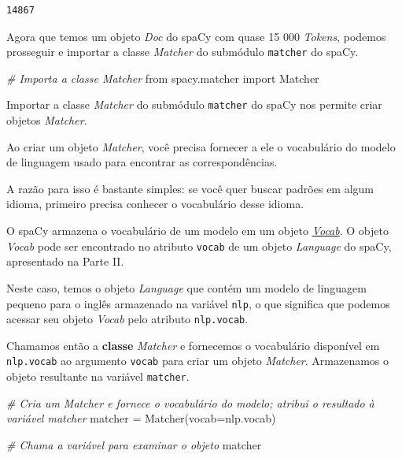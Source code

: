 \documentclass[
  brazilian,
]{article}
\newenvironment{Shaded}{}{}
\newcommand{\CommentTok}[1]{\textcolor[rgb]{0.38,0.63,0.69}{\textit{#1}}}
\newcommand{\ImportTok}[1]{#1}
\newcommand{\NormalTok}[1]{#1}
\newcommand{\OperatorTok}[1]{\textcolor[rgb]{0.40,0.40,0.40}{#1}}
\begin{document}
\begin{verbatim}
14867
\end{verbatim}

Agora que temos um objeto \emph{Doc} do spaCy com quase 15 000
\emph{Tokens}, podemos prosseguir e importar a classe \emph{Matcher} do
submódulo \texttt{matcher} do spaCy.

\begin{Shaded}
\begin{Highlighting}[]
\CommentTok{\# Importa a classe Matcher}
\ImportTok{from}\NormalTok{ spacy.matcher }\ImportTok{import}\NormalTok{ Matcher}
\end{Highlighting}
\end{Shaded}

Importar a classe \emph{Matcher} do submódulo \texttt{matcher} do spaCy
nos permite criar objetos \emph{Matcher}.

Ao criar um objeto \emph{Matcher}, você precisa fornecer a ele o
vocabulário do modelo de linguagem usado para encontrar as
correspondências.

A razão para isso é bastante simples: se você quer buscar padrões em
algum idioma, primeiro precisa conhecer o vocabulário desse idioma.

O spaCy armazena o vocabulário de um modelo em um objeto
\href{https://spacy.io/api/vocab}{\emph{Vocab}}. O objeto \emph{Vocab}
pode ser encontrado no atributo \texttt{vocab} de um objeto
\emph{Language} do spaCy, apresentado na Parte II.

Neste caso, temos o objeto \emph{Language} que contém um modelo de
linguagem pequeno para o inglês armazenado na variável \texttt{nlp}, o
que significa que podemos acessar seu objeto \emph{Vocab} pelo atributo
\texttt{nlp.vocab}.

Chamamos então a \textbf{classe} \emph{Matcher} e fornecemos o
vocabulário disponível em \texttt{nlp.vocab} ao argumento \texttt{vocab}
para criar um objeto \emph{Matcher}. Armazenamos o objeto resultante na
variável \texttt{matcher}.

\begin{Shaded}
\begin{Highlighting}[]
\CommentTok{\# Cria um Matcher e fornece o vocabulário do modelo; atribui o resultado à variável \textquotesingle{}matcher\textquotesingle{}}
\NormalTok{matcher }\OperatorTok{=}\NormalTok{ Matcher(vocab}\OperatorTok{=}\NormalTok{nlp.vocab)}

\CommentTok{\# Chama a variável para examinar o objeto}
\NormalTok{matcher}
\end{Highlighting}
\end{Shaded}
\end{document}
